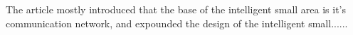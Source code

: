 The article mostly introduced that the base of the intelligent small area is it's communication network, and expounded the design of the intelligent small......\par
